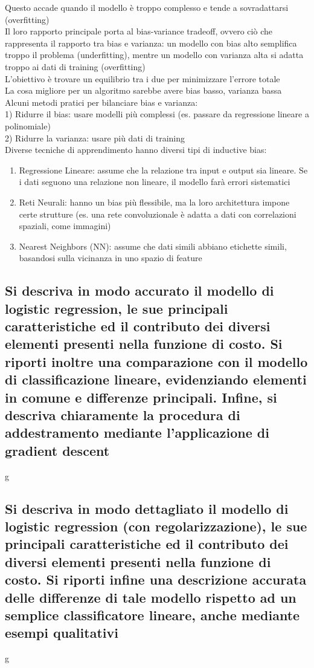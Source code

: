 \documentclass[10pt,oneside,a4paper]{article}
\begin{document}
Questo accade quando il modello è troppo complesso e tende a sovradattarsi (overfitting)\\
Il loro rapporto principale porta al bias-variance tradeoff, ovvero ciò che rappresenta il rapporto tra bias e varianza: un modello con bias alto semplifica troppo il problema (underfitting), mentre un modello con varianza alta si adatta troppo ai dati di training (overfitting)\\
L'obiettivo è trovare un equilibrio tra i due per minimizzare l'errore totale\\
La cosa migliore per un algoritmo sarebbe avere bias basso, varianza bassa\\
Alcuni metodi pratici per bilanciare bias e varianza:\\
1) Ridurre il bias: usare modelli più complessi (es. passare da regressione lineare a polinomiale)\\
2) Ridurre la varianza: usare più dati di training\\
Diverse tecniche di apprendimento hanno diversi tipi di inductive bias:\\
\begin{enumerate}
	\item Regressione Lineare: assume che la relazione tra input e output sia lineare. Se i dati seguono una relazione non lineare, il modello farà errori sistematici
	\item Reti Neurali: hanno un bias più flessibile, ma la loro architettura impone certe strutture (es. una rete convoluzionale è adatta a dati con correlazioni spaziali, come immagini)
	\item Nearest Neighbors (NN): assume che dati simili abbiano etichette simili, basandosi sulla vicinanza in uno spazio di feature
\end{enumerate}
\subsection{Si descriva in modo accurato il modello di logistic regression, le sue principali caratteristiche
	ed il contributo dei diversi elementi presenti nella funzione di costo. Si riporti inoltre
	una comparazione con il modello di classificazione lineare, evidenziando elementi in comune
	e differenze principali. Infine, si descriva chiaramente la procedura di addestramento
	mediante l’applicazione di gradient descent}
g
\subsection{Si descriva in modo dettagliato il modello di logistic regression (con regolarizzazione), le
	sue principali caratteristiche ed il contributo dei diversi elementi presenti nella funzione
	di costo. Si riporti infine una descrizione accurata delle differenze di tale modello rispetto
	ad un semplice classificatore lineare, anche mediante esempi qualitativi}
g
\end{document}
